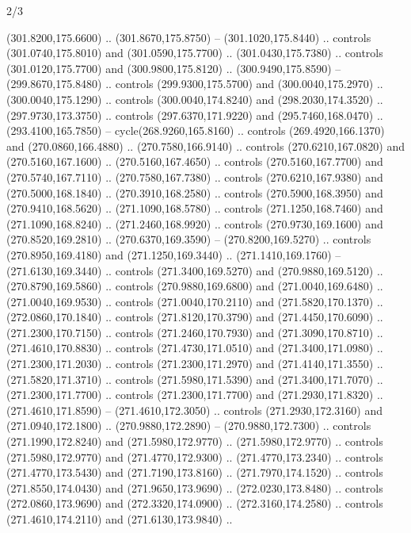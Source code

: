 \begin{flagdescription}{2/3}
\begin{scope}[xshift=0.5\flaglength,yshift=0.5\flagwidth,scale=\flagwidth/259.2]
\begin{scope}[y=0.8pt, x=0.8pt, yscale=-1,shift={(-243,-162)}]
      (301.8200,175.6600) .. (301.8670,175.8750) -- (301.1020,175.8440) .. controls
      (301.0740,175.8010) and (301.0590,175.7700) .. (301.0430,175.7380) .. controls
      (301.0120,175.7700) and (300.9800,175.8120) .. (300.9490,175.8590) --
      (299.8670,175.8480) .. controls (299.9300,175.5700) and (300.0040,175.2970) ..
      (300.0040,175.1290) .. controls (300.0040,174.8240) and (298.2030,174.3520) ..
      (297.9730,173.3750) .. controls (297.6370,171.9220) and (295.7460,168.0470) ..
      (293.4100,165.7850) -- cycle(268.9260,165.8160) .. controls
      (269.4920,166.1370) and (270.0860,166.4880) .. (270.7580,166.9140) .. controls
      (270.6210,167.0820) and (270.5160,167.1600) .. (270.5160,167.4650) .. controls
      (270.5160,167.7700) and (270.5740,167.7110) .. (270.7580,167.7380) .. controls
      (270.6210,167.9380) and (270.5000,168.1840) .. (270.3910,168.2580) .. controls
      (270.5900,168.3950) and (270.9410,168.5620) .. (271.1090,168.5780) .. controls
      (271.1250,168.7460) and (271.1090,168.8240) .. (271.2460,168.9920) .. controls
      (270.9730,169.1600) and (270.8520,169.2810) .. (270.6370,169.3590) --
      (270.8200,169.5270) .. controls (270.8950,169.4180) and (271.1250,169.3440) ..
      (271.1410,169.1760) -- (271.6130,169.3440) .. controls (271.3400,169.5270) and
      (270.9880,169.5120) .. (270.8790,169.5860) .. controls (270.9880,169.6800) and
      (271.0040,169.6480) .. (271.0040,169.9530) .. controls (271.0040,170.2110) and
      (271.5820,170.1370) .. (272.0860,170.1840) .. controls (271.8120,170.3790) and
      (271.4450,170.6090) .. (271.2300,170.7150) .. controls (271.2460,170.7930) and
      (271.3090,170.8710) .. (271.4610,170.8830) .. controls (271.4730,171.0510) and
      (271.3400,171.0980) .. (271.2300,171.2030) .. controls (271.2300,171.2970) and
      (271.4140,171.3550) .. (271.5820,171.3710) .. controls (271.5980,171.5390) and
      (271.3400,171.7070) .. (271.2300,171.7700) .. controls (271.2300,171.7700) and
      (271.2930,171.8320) .. (271.4610,171.8590) -- (271.4610,172.3050) .. controls
      (271.2930,172.3160) and (271.0940,172.1800) .. (270.9880,172.2890) --
      (270.9880,172.7300) .. controls (271.1990,172.8240) and (271.5980,172.9770) ..
      (271.5980,172.9770) .. controls (271.5980,172.9770) and (271.4770,172.9300) ..
      (271.4770,173.2340) .. controls (271.4770,173.5430) and (271.7190,173.8160) ..
      (271.7970,174.1520) .. controls (271.8550,174.0430) and (271.9650,173.9690) ..
      (272.0230,173.8480) .. controls (272.0860,173.9690) and (272.3320,174.0900) ..
      (272.3160,174.2580) .. controls (271.4610,174.2110) and (271.6130,173.9840) ..

\end{scope}
\end{scope}
\end{flagdescription}
